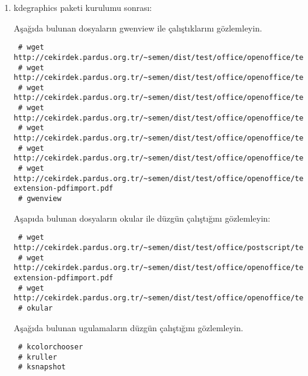 \documentclass[a4paper,10pt]{article}
\begin{document}
\begin{enumerate}
\item kdegraphics paketi kurulumu sonrası:

Aşağıda bulunan dosyaların gwenview  ile çalıştıklarını gözlemleyin.  
\begin{verbatim} 
 # wget http://cekirdek.pardus.org.tr/~semen/dist/test/office/openoffice/test_oodraw.jpg
 # wget http://cekirdek.pardus.org.tr/~semen/dist/test/office/openoffice/test_oodraw.mng
 # wget http://cekirdek.pardus.org.tr/~semen/dist/test/office/openoffice/test_oodraw.png
 # wget http://cekirdek.pardus.org.tr/~semen/dist/test/office/openoffice/test_oodraw.ps
 # wget http://cekirdek.pardus.org.tr/~semen/dist/test/office/openoffice/test_oodraw.tif
 # wget http://cekirdek.pardus.org.tr/~semen/dist/test/office/openoffice/test_oodraw.xcf
 # wget http://cekirdek.pardus.org.tr/~semen/dist/test/office/openoffice/test_openoffice-extension-pdfimport.pdf
 # gwenview
\end{verbatim}
Aşapıda bulunan dosyaların okular ile düzgün çalıştığını gözlemleyin:
\begin{verbatim} 
 # wget http://cekirdek.pardus.org.tr/~semen/dist/test/office/postscript/test_ghostscript.dvi
 # wget http://cekirdek.pardus.org.tr/~semen/dist/test/office/openoffice/test_openoffice-extension-pdfimport.pdf
 # wget http://cekirdek.pardus.org.tr/~semen/dist/test/office/openoffice/test_oodraw.ps
 # okular
 \end{verbatim}

Aşağıda bulunan ugulamaların düzgün çalıştığını gözlemleyin.
\begin{verbatim}
 # kcolorchooser
 # kruller
 # ksnapshot
\end{verbatim}


\end{enumerate}
\end{document}
